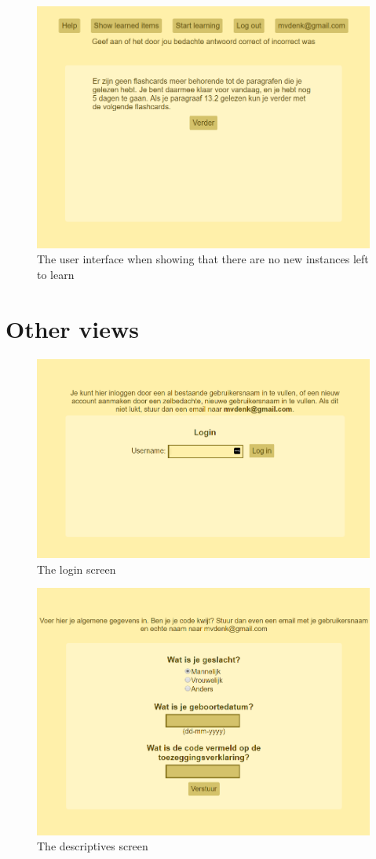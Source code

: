 \begin{figure}
    \centering
    \includegraphics[width=.8\textwidth]{img/ui_no_more_instances.png}
    \caption{The user interface when showing that there are no new instances left to learn}
    \label{fig:ui_no_more_instances}
\end{figure}

\FloatBarrier
\section{Other views}

\begin{figure}
    \centering
    \includegraphics[width=.8\textwidth]{img/ui_login.png}
    \caption{The login screen}
    \label{fig:ui_login}
\end{figure}

\begin{figure}
    \centering
    \includegraphics[width=.8\textwidth]{img/ui_descriptives.png}
    \caption{The descriptives screen}
    \label{fig:ui_descriptives}
\end{figure}

